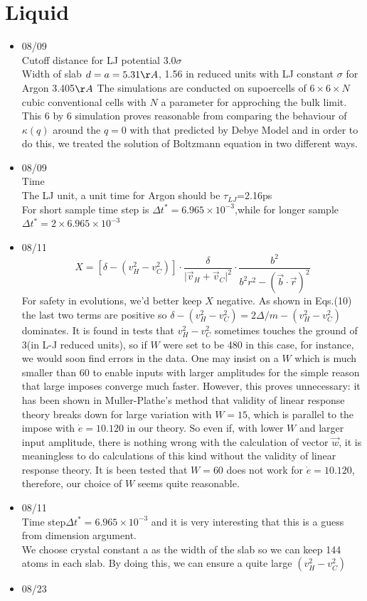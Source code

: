 \documentclass{article}
\begin{document}
\section*{Liquid}
\begin{itemize}
\item \mbox{08/09}\\
Cutoff distance for LJ potential 3.0$\sigma$\\
Width of slab $d=a=5.31\AA$, 1.56 in reduced units with LJ constant $\sigma$ for Argon 3.405$\AA$ 
The simulations are conducted on supoercells of $6\times6\times{N}$ cubic conventional cells with $N$ a parameter for approching the bulk limit. This 6 by 6 simulation proves reasonable from comparing the behaviour of $\kappa(q)$ around the $q=0$ with that predicted by Debye Model and in order to do this, we treated the solution of Boltzmann equation in two different ways.
\item \mbox{08/09}\\
Time \\
The LJ unit, a unit time for Argon should be $\tau_{LJ}$=2.16ps\\
For short sample time step is $\Delta t^*=6.965\times10^{-3}$,while for longer sample $\Delta t^*=2\times6.965\times10^{-3}$\\
\item \mbox{08/11}\\

\begin{equation*}
X = [\delta-(v_H^2-v_C^2)]\cdot\frac{\delta}{\lvert \vec{v}_H+\vec{v}_C\lvert^2}\cdot\frac{b^2}{b^2r^2-(\vec{b}\cdot\vec{r})^2}
\end{equation*}
For safety in evolutions, we'd better keep $X$ negative. As shown in Eqs.(10) the last two terms are positive so $\delta-(v_H^2-v_C^2)=2\Delta/m-(v_H^2-v_C^2)$ dominates. It is found in tests that $v_H^2-v_C^2$ sometimes touches the ground of 3(in L-J reduced units), so if $W$ were set to be 480 in this case, for instance, we would soon find errors in the data. One may insist on a $W$ which is much smaller than 60 to enable inputs with larger amplitudes for the simple reason that large imposes converge much faster. However, this proves unnecessary: it has been shown in Muller-Plathe's method that validity of linear response theory breaks down for large variation with $W=15$, which is parallel to the impose with  $\dot{e}=10.120$ in our theory. So even if, with lower $W$ and larger input amplitude, there is nothing wrong with the calculation of vector $\vec{w}$, it is meaningless to do calculations of this kind without the validity of linear response theory. It is been tested that $W=60$ does not work for $\dot{e}=10.120$, therefore, our choice of $W$ seems quite reasonable.
\item \mbox{08/11}\\
Time step$\Delta t^*=6.965\times10^{-3}$ and it is very interesting that this is a guess from dimension argument.\\
We choose crystal constant a as the width of the slab so we can keep 144 atoms in each slab. By doing this, we can ensure a quite large $(v_H^2-v_C^2)$
\item \mbox{08/23}\\


\end{itemize}
\end{document}
